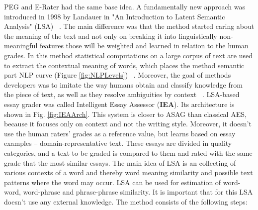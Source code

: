 PEG and E-Rater had the same base idea. A fundamentally new approach was introduced in 1998 by Landauer in "An Introduction to Latent Semantic Analysis" (LSA) ~\cite{LSA}. The main difference was that the method started caring about the meaning of the text and not only on breaking it into linguistically non-meaningful features those will be weighted and learned in relation to the human grades. In this method statistical  computations on a large corpus of text are used to extract the contextual meaning of words, which places the method semantic part NLP curve (Figure \ref{fig:NLPLevels}) ~\cite{LSA}. Moreover, the goal of methods developers was to imitate the way humans obtain and classify knowledge from the piece of text, as well as they resolve ambiguities by context ~\cite{Blood}. LSA-based essay grader was called Intelligent Essay Assessor (\textbf{IEA}). Its architecture is shown in Fig. \ref{fig:IEAArch}. This system is closer to ASAG than classical AES, because it focuses only on context and not the writing style. Moreover, it doesn't use the human raters' grades as a reference value, but learns based on essay examples -- domain-representative text. These essays are divided in quality categories, and a text to be graded is compared to them and rated with the same grade that the most similar essays. The main idea of LSA is an collecting of various contexts of a word and thereby word meaning similarity and possible text patterns where the word may occur. LSA can be used for estimation of word-word, word-phrase and phrase-phrase similarity. It is important that for this LSA doesn't use any external knowledge. The method consists of the following steps:

